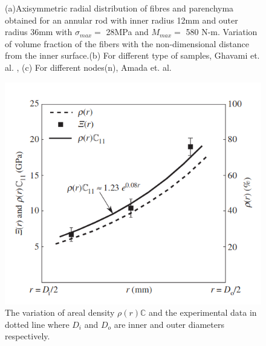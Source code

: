 \documentclass[openright,twoside]{iitkthesis}
\begin{document}
\begin{figure}[H]
\begin{center}
{     }
     \vfill
\caption{(a)Axisymmetric radial distribution of fibres and parenchyma obtained for an annular rod    with inner radius 12mm and outer radius 36mm with $\sigma_{max} = $ 28MPa and $M_{max} = $ 580 N-m. Variation of volume fraction of the fibers with the non-dimensional distance from the inner surface.(b) For different type of samples, Ghavami et. al. \cite{ghavami2003bamboo}, (c) For different nodes(n), Amada et. al. \cite{amada1996mechanical} }
\label{fig:radial}
\end{center}
\end{figure}
\begin{figure}[H]
\begin{center}
\includegraphics[scale=0.41]{./Plots/normal/mnn.png}
\caption{The variation of areal density $\rho(r)\mathbb{C}$ and the experimental data in dotted line where $D_i$ and $D_o$ are inner and outer diameters respectively. \cite{mannan2017correlations} }
\label{fig:radial2}
\end{center}
\end{figure}
\end{document}
